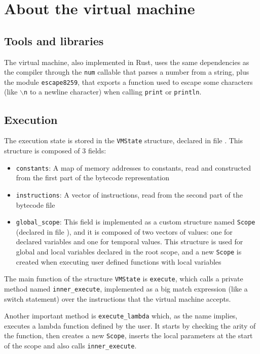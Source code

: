 \documentclass[11pt]{scrreprt}
\begin{document}
\pagebreak
\chapter{About the virtual machine}

\section{Tools and libraries}
The virtual machine, also implemented in Rust, uses the same dependencies as the compiler through the \texttt{num} callable that parses a number from a string, plus the module \texttt{escape8259}, that exports a function used to escape some characters (like \texttt{$\backslash$n} to a newline character) when calling \texttt{print} or \texttt{println}.

\section{Execution}
The execution state is stored in the \texttt{VMState} structure, declared in file . This structure is composed of 3 fields:
\begin{itemize}
  \item \texttt{constants}: A map of memory addresses to constants, read and constructed from the first part of the bytecode representation
  \item \texttt{instructions}: A vector of instructions, read from the second part of the bytecode file
  \item \texttt{global\_scope}: This field is implemented as a custom structure named \texttt{Scope} (declared in file ), and it is composed of two vectors of values: one for declared variables and one for temporal values. This structure is used for global and local variables declared in the root scope, and a new \texttt{Scope} is created when executing user defined functions with local variables
\end{itemize}

The main function of the structure \texttt{VMState} is \texttt{execute}, which calls a private method named \texttt{inner\_execute}, implemented as a big match expression (like a switch statement) over the instructions that the virtual machine accepts.

Another important method is \texttt{execute\_lambda} which, as the name implies, executes a lambda function defined by the user. It starts by checking the arity of the function, then creates a new \texttt{Scope}, inserts the local parameters at the start of the scope and also calls \texttt{inner\_execute}.
\end{document}

